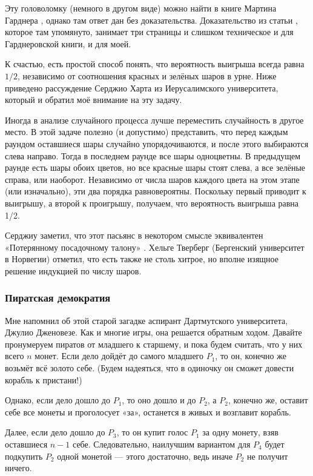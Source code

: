 Эту головоломку (немного в другом виде) можно найти в книге Мартина Гарднера \cite[2.16]{30}, однако там ответ дан без доказательства.
Доказательство из статьи \cite{45}, которое там упомянуто, занимает три страницы и слишком техническое и для Гарднеровской книги, и для моей.

К счастью, есть простой способ понять, что вероятность выигрыша всегда равна $1/2$, независимо от соотношения красных и зелёных шаров в урне.
Ниже приведено рассуждение Серджио Харта из Иерусалимского университета, который и обратил моё внимание на эту задачу.

Иногда в анализе случайного процесса лучше переместить случайность в другое место.
В этой задаче полезно (и допустимо) представить, что перед каждым раундом оставшиеся шары случайно упорядочиваются, и после этого выбираются слева направо.
Тогда в последнем раунде все шары одноцветны.
В предыдущем раунде есть шары обоих цветов, но все красные шары стоят слева, а все зелёные справа, или наоборот.
Независимо от числа шаров каждого цвета на этом этапе (или изначально), эти два порядка равновероятны.
Поскольку первый приводит к выигрышу, а второй к проигрышу, получаем, что вероятность выигрыша равна 1/2.

Серджиу заметил, что этот пасьянс в некотором смысле эквивалентен «Потерянному посадочному талону» \cite[стр. 42]{59}.
Хельге Тверберг (Бергенский университет в Норвегии) отметил, что есть также не столь хитрое, но вполне изящное решение индукцией по числу шаров.

\subsubsection*{Пиратская демократия}

Мне напомнил об этой старой загадке аспирант Дартмутского университета, Джулио Дженовезе.
Как и многие игры, она решается обратным ходом.
Давайте пронумеруем пиратов от младшего к старшему, и пока будем считать, что у них всего $n$ монет.
Если дело дойдёт до самого младшего $P_1$, то он, конечно же возьмёт всё золото себе.
(Будем надеяться, что в одиночку он сможет довести корабль к пристани!)

Однако, если дело дошло до $P_1$, то оно дошло и до $P_2$, а
$P_2$, конечно же, оставит себе все монеты и проголосует «за», останется в живых и возглавит корабль.

Далее, если дело дошло до $P_3$, то он купит голос $P_1$ за одну монету, взяв оставшиеся $n - 1$ себе.
Следовательно, наилучшим вариантом для $P_4$ будет подкупить $P_2$ одной монетой ---
этого достаточно, ведь иначе $P_2$ не получит ничего.

